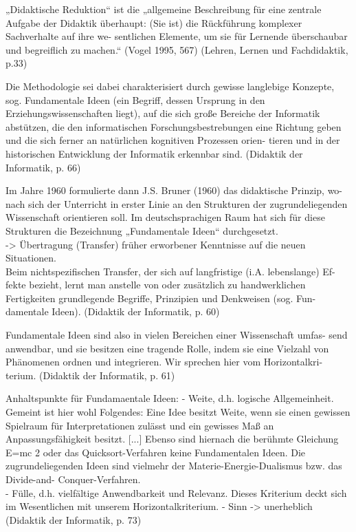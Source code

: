 
\hrulefill

„Didaktische  Reduktion“  ist  die  „allgemeine  Beschreibung  für  eine  zentrale  Aufgabe 
der Didaktik überhaupt: (Sie ist) die Rückführung komplexer Sachverhalte auf ihre we-
sentlichen  Elemente,  um  sie  für  Lernende  überschaubar  und  begreiflich  zu  machen.“ 
(Vogel 1995, 567)  
(Lehren, Lernen und Fachdidaktik, p.33)

\hrulefill

Die  Methodologie sei dabei charakterisiert 
durch gewisse langlebige Konzepte, sog. Fundamentale Ideen (ein Begriff, dessen 
Ursprung in den Erziehungswissenschaften liegt), auf die sich große Bereiche 
der Informatik abstützen, die den informatischen Forschungsbestrebungen eine 
Richtung geben und die sich ferner an natürlichen kognitiven Prozessen orien-
tieren und in der historischen Entwicklung der Informatik erkennbar sind. 
(Didaktik der Informatik, p. 66)

Im Jahre 1960 formulierte dann J.S. Bruner (1960) das didaktische Prinzip, wo-
nach sich der Unterricht in erster Linie an den Strukturen der zugrundeliegenden 
Wissenschaft  orientieren  soll.  Im  deutschsprachigen  Raum  hat  sich  für  diese 
Strukturen die Bezeichnung „Fundamentale Ideen“ durchgesetzt. \\
-> Übertragung (Transfer) früher erworbener Kenntnisse auf die neuen Situationen.\\
Beim nichtspezifischen Transfer, der sich auf langfristige (i.A. lebenslange) Ef-
fekte  bezieht,  lernt  man  anstelle  von  oder  zusätzlich  zu  handwerklichen 
Fertigkeiten grundlegende Begriffe, Prinzipien und Denkweisen (sog. Fun-
damentale Ideen).
(Didaktik der Informatik, p. 60)

Fundamentale  Ideen  sind  also  in  vielen  Bereichen  einer  Wissenschaft  umfas-
send anwendbar, und sie besitzen eine tragende Rolle, indem sie eine Vielzahl 
von Phänomenen ordnen und integrieren. Wir sprechen hier vom Horizontalkri-
terium.
(Didaktik der Informatik, p. 61)

Anhaltspunkte für Fundamaentale Ideen:
-  Weite, d.h. logische Allgemeinheit. Gemeint ist hier wohl Folgendes: Eine 
Idee besitzt Weite, wenn sie einen gewissen Spielraum für Interpretationen 
zulässt und ein gewisses Maß an Anpassungsfähigkeit besitzt. [...] 
Ebenso sind hiernach die berühmte Gleichung E=mc 2  oder das 
Quicksort-Verfahren  keine  Fundamentalen  Ideen.  Die  zugrundeliegenden 
Ideen sind vielmehr der Materie-Energie-Dualismus bzw. das Divide-and-
Conquer-Verfahren. \\
-  Fülle, d.h. vielfältige Anwendbarkeit und Relevanz. Dieses Kriterium deckt 
sich im Wesentlichen mit unserem Horizontalkriterium. 
- Sinn -> unerheblich
(Didaktik der Informatik, p. 73)

